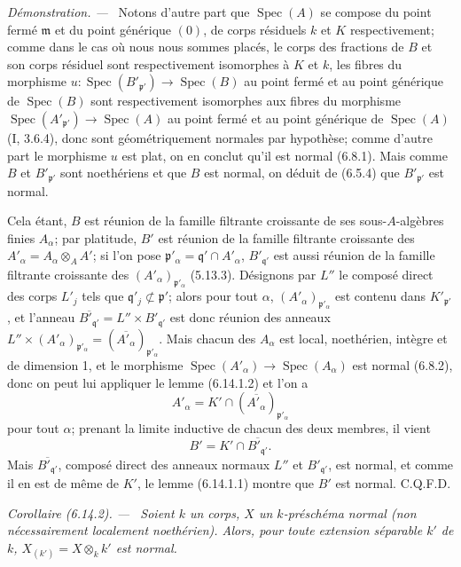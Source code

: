 \documentclass[10pt,oneside]{book}
\newenvironment{corollary}[1][]{%
  \par\medskip\noindent\itshape Corollaire (#1). ---\ }{\par}
\newenvironment{proof}{%
  \par\medskip\noindent\textit{Démonstration. ---\ }}{\par}
\begin{document}
\begin{proof}
Notons d'autre part que $\operatorname{Spec}(A)$ se compose du point fermé
$\mathfrak m$ et du point générique $(0)$, de corps résiduels $k$ et $K$
respectivement; comme dans le cas où nous nous sommes placés, le corps des
fractions de $B$ et son corps résiduel sont respectivement isomorphes à $K$
et $k$, les fibres du morphisme
$u:\operatorname{Spec}(B'_{\mathfrak p'})\to\operatorname{Spec}(B)$ au
point fermé et au point générique de $\operatorname{Spec}(B)$ sont
respectivement isomorphes aux fibres du morphisme
$\operatorname{Spec}(A'_{\mathfrak p'})\to\operatorname{Spec}(A)$ au point
fermé et au point générique de $\operatorname{Spec}(A)$ (I, 3.6.4), donc
sont géométriquement normales par hypothèse; comme d'autre part le
morphisme $u$ est plat, on en conclut qu'il est normal (6.8.1). Mais comme
$B$ et $B'_{\mathfrak p'}$ sont noethériens et que $B$ est normal, on
déduit de (6.5.4) que $B'_{\mathfrak p'}$ est normal.

Cela étant, $B$ est réunion de la famille filtrante croissante de ses
sous-$A$-algèbres finies $A_\alpha$; par platitude, $B'$ est réunion de la
famille filtrante croissante des
$A'_\alpha=A_\alpha\otimes_A A'$; si l'on pose
$\mathfrak p'_\alpha=\mathfrak q'\cap A'_\alpha$,
$B'_{\mathfrak q'}$ est aussi réunion de la famille filtrante croissante
des $(A'_\alpha)_{\mathfrak p'_\alpha}$ (5.13.3). Désignons par $L''$ le
composé direct des corps $L'_j$ tels que
$\mathfrak q'_j\not\subset\mathfrak p'$; alors pour tout $\alpha$,
$(A'_\alpha)_{\mathfrak p'_\alpha}$ est contenu dans
$K'_{\mathfrak p'}$, et l'anneau
$\overline{B'_{\mathfrak q'}}=L''\times B'_{\mathfrak q'}$ est donc réunion
des anneaux
$L''\times(A'_\alpha)_{\mathfrak p'_\alpha}=
(\overline{A'_\alpha})_{\mathfrak p'_\alpha}$. Mais chacun des $A_\alpha$
est local, noethérien, intègre et de dimension 1, et le morphisme
$\operatorname{Spec}(A'_\alpha)\to\operatorname{Spec}(A_\alpha)$ est
normal (6.8.2), donc on peut lui appliquer le lemme (6.14.1.2) et l'on a
\[
A'_\alpha=K'\cap(\overline{A'_\alpha})_{\mathfrak p'_\alpha}
\]
pour tout $\alpha$; prenant la limite inductive de chacun des deux membres,
il vient
\[
B'=K'\cap\overline{B'_{\mathfrak q'}}.
\]
Mais $\overline{B'_{\mathfrak q'}}$, composé direct des anneaux normaux
$L''$ et $B'_{\mathfrak q'}$, est normal, et comme il en est de même de
$K'$, le lemme (6.14.1.1) montre que $B'$ est normal. C.Q.F.D.
\end{proof}

\begin{corollary}[6.14.2]
\label{IV.2.s6.14.2-fr}
Soient $k$ un corps, $X$ un $k$-préschéma normal (non nécessairement
localement noethérien). Alors, pour toute extension séparable $k'$ de $k$,
$X_{(k')}=X\otimes_k k'$ est normal.
\end{corollary}
\end{document}

